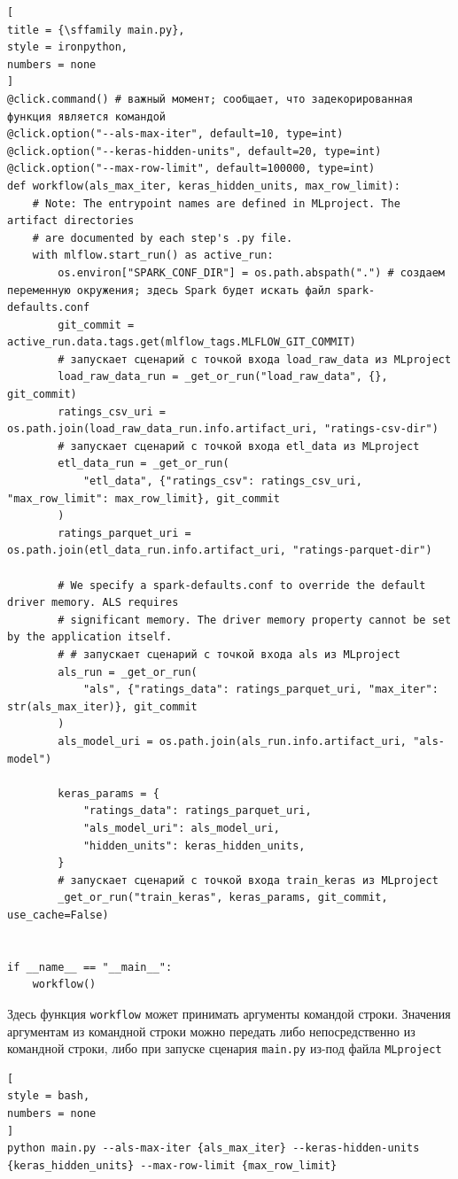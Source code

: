 \documentclass[%
	11pt,
	a4paper,
	utf8,
		]{article}
\begin{document}
\begin{lstlisting}[
title = {\sffamily main.py},
style = ironpython,
numbers = none	
]
@click.command() # важный момент; сообщает, что задекорированная функция является командой
@click.option("--als-max-iter", default=10, type=int)
@click.option("--keras-hidden-units", default=20, type=int)
@click.option("--max-row-limit", default=100000, type=int)
def workflow(als_max_iter, keras_hidden_units, max_row_limit):
	# Note: The entrypoint names are defined in MLproject. The artifact directories
	# are documented by each step's .py file.
	with mlflow.start_run() as active_run:
		os.environ["SPARK_CONF_DIR"] = os.path.abspath(".") # создаем переменную окружения; здесь Spark будет искать файл spark-defaults.conf
		git_commit = active_run.data.tags.get(mlflow_tags.MLFLOW_GIT_COMMIT)
		# запускает сценарий с точкой входа load_raw_data из MLproject
		load_raw_data_run = _get_or_run("load_raw_data", {}, git_commit)
		ratings_csv_uri = os.path.join(load_raw_data_run.info.artifact_uri, "ratings-csv-dir")
		# запускает сценарий с точкой входа etl_data из MLproject
		etl_data_run = _get_or_run(
			"etl_data", {"ratings_csv": ratings_csv_uri, "max_row_limit": max_row_limit}, git_commit
		)
		ratings_parquet_uri = os.path.join(etl_data_run.info.artifact_uri, "ratings-parquet-dir")

		# We specify a spark-defaults.conf to override the default driver memory. ALS requires
		# significant memory. The driver memory property cannot be set by the application itself.
		# # запускает сценарий с точкой входа als из MLproject
		als_run = _get_or_run(
			"als", {"ratings_data": ratings_parquet_uri, "max_iter": str(als_max_iter)}, git_commit
		)
		als_model_uri = os.path.join(als_run.info.artifact_uri, "als-model")
		
		keras_params = {
			"ratings_data": ratings_parquet_uri,
			"als_model_uri": als_model_uri,
			"hidden_units": keras_hidden_units,
		}
		# запускает сценарий с точкой входа train_keras из MLproject
		_get_or_run("train_keras", keras_params, git_commit, use_cache=False)


if __name__ == "__main__":
	workflow()
\end{lstlisting}

Здесь функция \texttt{workflow} может принимать аргументы командой строки. Значения аргументам из командной строки можно передать либо непосредственно из командной строки, либо при запуске сценария \texttt{main.py} из-под файла \texttt{MLproject}
\begin{lstlisting}[
style = bash,
numbers = none
]
python main.py --als-max-iter {als_max_iter} --keras-hidden-units {keras_hidden_units} --max-row-limit {max_row_limit}
\end{lstlisting}
\end{document}
